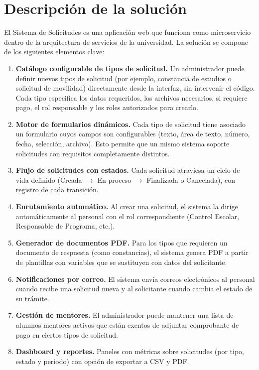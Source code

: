\documentclass[12pt,letterpaper]{report}
\begin{document}
\section{Descripción de la solución}

El Sistema de Solicitudes es una aplicación web que funciona como microservicio dentro de la arquitectura de servicios de la universidad. La solución se compone de los siguientes elementos clave:

\begin{enumerate}
    \item \textbf{Catálogo configurable de tipos de solicitud.} Un administrador puede definir nuevos tipos de solicitud (por ejemplo, constancia de estudios o solicitud de movilidad) directamente desde la interfaz, sin intervenir el código. Cada tipo especifica los datos requeridos, los archivos necesarios, si requiere pago, el rol responsable y los roles autorizados para crearlo.

    \item \textbf{Motor de formularios dinámicos.} Cada tipo de solicitud tiene asociado un formulario cuyos campos son configurables (texto, área de texto, número, fecha, selección, archivo). Esto permite que un mismo sistema soporte solicitudes con requisitos completamente distintos.

    \item \textbf{Flujo de solicitudes con estados.} Cada solicitud atraviesa un ciclo de vida definido (Creada $\rightarrow$ En proceso $\rightarrow$ Finalizada o Cancelada), con registro de cada transición.

    \item \textbf{Enrutamiento automático.} Al crear una solicitud, el sistema la dirige automáticamente al personal con el rol correspondiente (Control Escolar, Responsable de Programa, etc.).

    \item \textbf{Generador de documentos PDF.} Para los tipos que requieren un documento de respuesta (como constancias), el sistema genera PDF a partir de plantillas con variables que se sustituyen con datos del solicitante.

    \item \textbf{Notificaciones por correo.} El sistema envía correos electrónicos al personal cuando recibe una solicitud nueva y al solicitante cuando cambia el estado de su trámite.

    \item \textbf{Gestión de mentores.} El administrador puede mantener una lista de alumnos mentores activos que están exentos de adjuntar comprobante de pago en ciertos tipos de solicitud.

    \item \textbf{Dashboard y reportes.} Paneles con métricas sobre solicitudes (por tipo, estado y periodo) con opción de exportar a CSV y PDF.
\end{enumerate}
\end{document}
